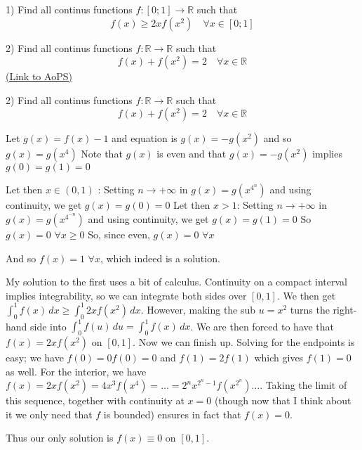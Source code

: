\begin{problem}
	1) Find all continus functions $f:[0;1]\to\mathbb{R}$ such that
\[f(x)\geq 2xf(x^2)\quad \forall x\in [0;1]\]

2) Find all continus functions $f:\mathbb{R}\to\mathbb{R}$ such that
\[f(x)+f(x^2)=2 \quad \forall x\in\mathbb{R}\]
	\flushright \href{https://artofproblemsolving.com/community/c6h562724}{(Link to AoPS)}
\end{problem}



\begin{solution}
	\begin{tcolorbox}2) Find all continus functions $f:\mathbb{R}\to\mathbb{R}$ such that
\[f(x)+f(x^2)=2 \quad \forall x\in\mathbb{R}\]\end{tcolorbox}
Let $g(x)=f(x)-1$ and equation is $g(x)=-g(x^2)$ and so $g(x)=g(x^4)$ 
Note that $g(x)$ is even and that $g(x)=-g(x^2)$ implies $g(0)=g(1)=0$

Let then $x\in (0,1)$ : Setting $n\to+\infty$ in $g(x)=g(x^{4^n})$ and using continuity, we get $g(x)=g(0)=0$
Let then $x>1$:  Setting $n\to+\infty$ in $g(x)=g(x^{4^{-n}})$ and using continuity, we get $g(x)=g(1)=0$
So $g(x)=0$ $\forall x\ge 0$
So, since even, $g(x)=0$ $\forall x$

And so $\boxed{f(x)=1}$ $\forall x$, which indeed is a solution.
\end{solution}



\begin{solution}
	My solution to the first uses a bit of calculus.
Continuity on a compact interval implies integrability, so we can integrate both sides over $[0, 1]$. We then get $\int_0^1 \! f(x) \, dx \ge \int_0^1 \! 2xf(x^2) \, dx$. However, making the sub $u = x^2$ turns the right-hand side into $\int_0^1 \! f(u) \, du = \int_0^1 \! f(x) \, dx$. We are then forced to have that $f(x) = 2xf(x^2)$ on $[0, 1]$. Now we can finish up. Solving for the endpoints is easy; we have $f(0) = 0f(0) = 0$ and $f(1) = 2f(1)$ which gives $f(1) = 0$ as well. For the interior, we have $f(x) = 2xf(x^2) = 4x^3f(x^4) = \dots = 2^nx^{2^n-1}f(x^{2^n}) \dots$. Taking the limit of this sequence, together with continuity at $x = 0$ (though now that I think about it we only need that $f$ is bounded) ensures in fact that $f(x) = 0$.

Thus our only solution is $f(x) \equiv 0$ on $[0,1]$.
\end{solution}




